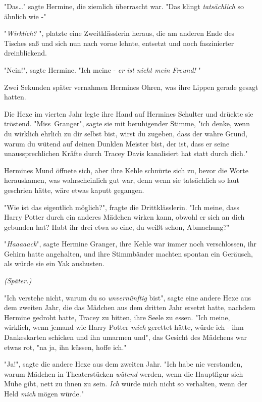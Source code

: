 {"Das…" sagte Hermine, die ziemlich überrascht war. "Das klingt \emph{tatsächlich} so ähnlich wie -"

"\emph{Wirklich?} ", platzte eine Zweitklässlerin heraus, die am anderen Ende des Tisches saß und sich nun nach vorne lehnte, entsetzt und noch faszinierter dreinblickend.

"Nein!", sagte Hermine. "Ich meine - \emph{er ist nicht mein Freund!} "

Zwei Sekunden später vernahmen Hermines Ohren, was ihre Lippen gerade gesagt hatten.

Die Hexe im vierten Jahr legte ihre Hand auf Hermines Schulter und drückte sie tröstend. "Miss~Granger", sagte sie mit beruhigender Stimme, "ich denke, wenn du wirklich ehrlich zu dir selbst bist, wirst du zugeben, dass der wahre Grund, warum du wütend auf deinen Dunklen Meister bist, der ist, dass er seine unaussprechlichen Kräfte durch Tracey Davis kanalisiert hat statt durch dich."

Hermines Mund öffnete sich, aber ihre Kehle schnürte sich zu, bevor die Worte herauskamen, was wahrscheinlich gut war, denn wenn sie tatsächlich so laut geschrien hätte, wäre etwas kaputt gegangen.

"Wie ist das eigentlich möglich?", fragte die Drittklässlerin. "Ich meine, dass Harry Potter durch ein anderes Mädchen wirken kann, obwohl er sich an dich gebunden hat? Habt ihr drei etwa so eine, du weißt schon, Abmachung?"

"\emph{Haaaaack}", sagte Hermine Granger, ihre Kehle war immer noch verschlossen, ihr Gehirn hatte angehalten, und ihre Stimmbänder machten spontan ein Geräusch, als würde sie ein Yak aushusten.

\emph{(Später.)}

"Ich verstehe nicht, warum du so \emph{unvernünftig} bist", sagte eine andere Hexe aus dem zweiten Jahr, die das Mädchen aus dem dritten Jahr ersetzt hatte, nachdem Hermine gedroht hatte, Tracey zu bitten, ihre Seele zu essen. "Ich meine, wirklich, wenn jemand wie Harry Potter \emph{mich} gerettet hätte, würde ich - ihm Dankeskarten schicken und ihn umarmen und", das Gesicht des Mädchens war etwas rot, "na ja, ihn küssen, hoffe ich."

"Ja!", sagte die andere Hexe aus dem zweiten Jahr. "Ich habe nie verstanden, warum Mädchen in Theaterstücken \emph{wütend} werden, wenn die Hauptfigur sich Mühe gibt, nett zu ihnen zu sein. \emph{Ich} würde mich nicht so verhalten, wenn der Held \emph{mich} mögen würde."

}
